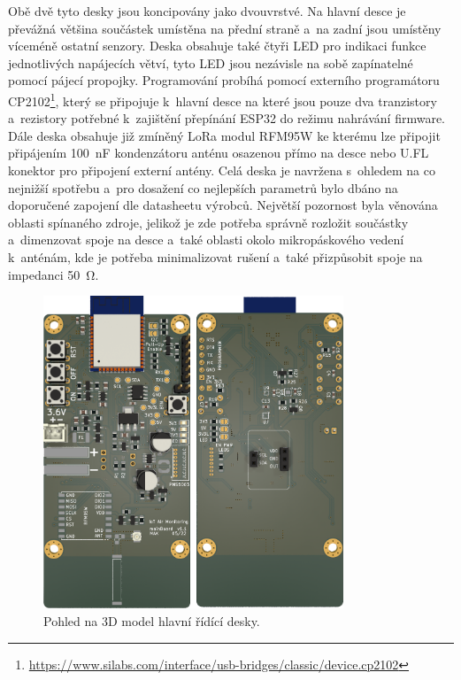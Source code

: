 Obě dvě tyto desky jsou koncipovány jako dvouvrstvé. Na hlavní desce je převážná většina součástek umístěna na přední straně a~na zadní jsou umístěny víceméně ostatní senzory. Deska obsahuje také čtyři LED pro indikaci funkce jednotlivých napájecích větví, tyto LED jsou nezávisle na sobě zapínatelné pomocí pájecí propojky. Programování probíhá pomocí externího programátoru CP2102\footnote{\url{https://www.silabs.com/interface/usb-bridges/classic/device.cp2102}}, který se připojuje k~hlavní desce na které jsou pouze dva tranzistory a~rezistory potřebné k~zajištění přepínání ESP32 do režimu nahrávání firmware. Dále deska obsahuje již zmíněný LoRa modul RFM95W ke kterému lze připojit připájením \SI{100}{\nano\farad} kondenzátoru anténu osazenou přímo na desce nebo U.FL konektor pro připojení externí antény. Celá deska je navržena s~ohledem na co nejnižší spotřebu a~pro dosažení co nejlepších parametrů bylo dbáno na doporučené zapojení dle datasheetu výrobců. Největší pozornost byla věnována oblasti spínaného zdroje, jelikož je zde potřeba správně rozložit součástky a~dimenzovat spoje na desce a~také oblasti okolo mikropáskového vedení k~anténám, kde je potřeba minimalizovat rušení a~také přizpůsobit spoje na impedanci \SI{50}{\ohm}.

\begin{figure}
    \centering
    \includegraphics[width=0.8\textwidth]{obrazky/mainBoard-kicad.png}
    \caption{Pohled na 3D model hlavní řídící desky.}
    \label{fig_mainBoardKicadRender}
\end{figure}

